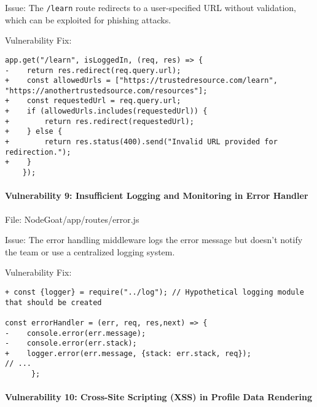   Issue: The \texttt{/learn} route redirects to a user-specified URL
  without validation, which can be exploited for phishing attacks.
  
  Vulnerability Fix:
  
  \scriptsize
  \begin{verbatim}
app.get("/learn", isLoggedIn, (req, res) => {
-    return res.redirect(req.query.url);
+    const allowedUrls = ["https://trustedresource.com/learn", "https://anothertrustedsource.com/resources"];
+    const requestedUrl = req.query.url;
+    if (allowedUrls.includes(requestedUrl)) {
+        return res.redirect(requestedUrl);
+    } else {
+        return res.status(400).send("Invalid URL provided for redirection.");
+    }
    });
    \end{verbatim}
    \normalsize
  
  \hypertarget{vulnerability-9-insufficient-logging-and-monitoring-in-error-handler}{%
  \paragraph{Vulnerability 9: Insufficient Logging and Monitoring in Error
  Handler}\label{vulnerability-9-insufficient-logging-and-monitoring-in-error-handler}}
  
  File: NodeGoat/app/routes/error.js
  
  Issue: The error handling middleware logs the error message but doesn't
  notify the team or use a centralized logging system.
  
  Vulnerability Fix:
  
  \begin{framed}\scriptsize
    \begin{verbatim}
+ const {logger} = require("../log"); // Hypothetical logging module that should be created

const errorHandler = (err, req, res,next) => {
-    console.error(err.message);
-    console.error(err.stack);
+    logger.error(err.message, {stack: err.stack, req});
// ...
      };
      \end{verbatim}
  \end{framed}\normalsize
  
  \hypertarget{vulnerability-10-cross-site-scripting-xss-in-profile-data-rendering}{%
  \paragraph{Vulnerability 10: Cross-Site Scripting (XSS) in Profile Data
  Rendering}\label{vulnerability-10-cross-site-scripting-xss-in-profile-data-rendering}}
  
